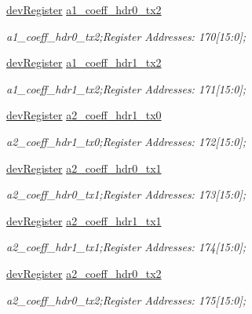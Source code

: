 \begin{DoxyCompactItemize}
\mbox{\hyperlink{classdev_register}{dev\+Register}} \mbox{\hyperlink{class_o_p_t3101_registers_a737736a0e4f1c175137ef73298f1eeb6}{a1\+\_\+coeff\+\_\+hdr0\+\_\+tx2}}
\begin{DoxyCompactList}\small\item\em a1\+\_\+coeff\+\_\+hdr0\+\_\+tx2;Register Addresses\+: 170\mbox{[}15\+:0\mbox{]}; \end{DoxyCompactList}\item 
\mbox{\hyperlink{classdev_register}{dev\+Register}} \mbox{\hyperlink{class_o_p_t3101_registers_ae1ef41f7c18e6683e722d263e01db08b}{a1\+\_\+coeff\+\_\+hdr1\+\_\+tx2}}
\begin{DoxyCompactList}\small\item\em a1\+\_\+coeff\+\_\+hdr1\+\_\+tx2;Register Addresses\+: 171\mbox{[}15\+:0\mbox{]}; \end{DoxyCompactList}\item 
\mbox{\hyperlink{classdev_register}{dev\+Register}} \mbox{\hyperlink{class_o_p_t3101_registers_a694abb9d95425dab461496a8c00f0e81}{a2\+\_\+coeff\+\_\+hdr1\+\_\+tx0}}
\begin{DoxyCompactList}\small\item\em a2\+\_\+coeff\+\_\+hdr1\+\_\+tx0;Register Addresses\+: 172\mbox{[}15\+:0\mbox{]}; \end{DoxyCompactList}\item 
\mbox{\hyperlink{classdev_register}{dev\+Register}} \mbox{\hyperlink{class_o_p_t3101_registers_a291942d9e1138cd5f6f37aad09e60337}{a2\+\_\+coeff\+\_\+hdr0\+\_\+tx1}}
\begin{DoxyCompactList}\small\item\em a2\+\_\+coeff\+\_\+hdr0\+\_\+tx1;Register Addresses\+: 173\mbox{[}15\+:0\mbox{]}; \end{DoxyCompactList}\item 
\mbox{\hyperlink{classdev_register}{dev\+Register}} \mbox{\hyperlink{class_o_p_t3101_registers_a62851b9e9b82fcb5a9b70b20f816f0a0}{a2\+\_\+coeff\+\_\+hdr1\+\_\+tx1}}
\begin{DoxyCompactList}\small\item\em a2\+\_\+coeff\+\_\+hdr1\+\_\+tx1;Register Addresses\+: 174\mbox{[}15\+:0\mbox{]}; \end{DoxyCompactList}\item 
\mbox{\hyperlink{classdev_register}{dev\+Register}} \mbox{\hyperlink{class_o_p_t3101_registers_aac5c3f4bb1d3b83706d6e60307622001}{a2\+\_\+coeff\+\_\+hdr0\+\_\+tx2}}
\begin{DoxyCompactList}\small\item\em a2\+\_\+coeff\+\_\+hdr0\+\_\+tx2;Register Addresses\+: 175\mbox{[}15\+:0\mbox{]}; \end{DoxyCompactList}\item 

\end{DoxyCompactItemize}
